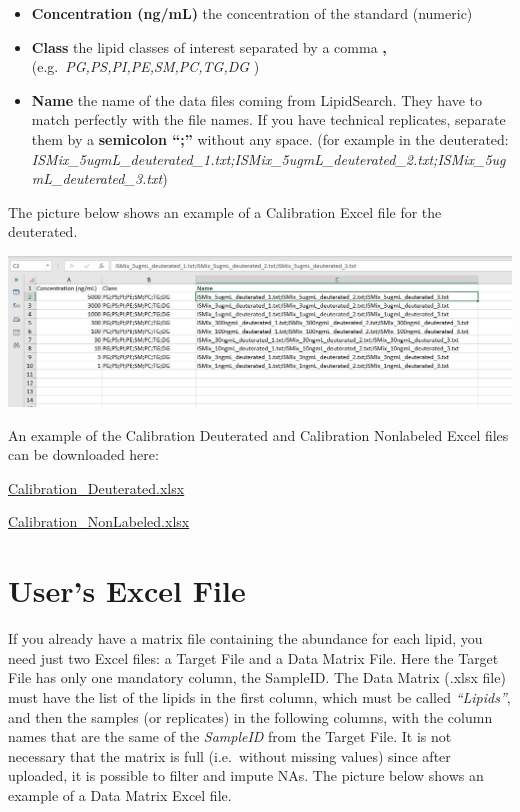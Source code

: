 \documentclass[
]{book}
\providecommand{\tightlist}{%
  \setlength{\itemsep}{0pt}\setlength{\parskip}{0pt}}
\begin{document}
\begin{itemize}
\tightlist
\item
  \textbf{Concentration (ng/mL)} the concentration of the standard (numeric)
\item
  \textbf{Class} the lipid classes of interest separated by a comma \textbf{,} (e.g.~\emph{PG,PS,PI,PE,SM,PC,TG,DG} )
\item
  \textbf{Name} the name of the data files coming from LipidSearch. They have to match perfectly with the file names. If you have technical replicates, separate them by a \textbf{semicolon ``;''} without any space. (for example in the deuterated: \emph{ISMix\_5ugmL\_deuterated\_1.txt;ISMix\_5ugmL\_deuterated\_2.txt;ISMix\_5ugmL\_deuterated\_3.txt})
\end{itemize}

The picture below shows an example of a Calibration Excel file for the deuterated.

\includegraphics[width=1\linewidth]{images/calibration_deut_example}

An example of the Calibration Deuterated and Calibration Nonlabeled Excel files can be downloaded here:

\href{https://github.com/ShinyFabio/ADViSELipidomics_book/raw/main/data_example/Calibration_Deuterated.xlsx}{Calibration\_Deuterated.xlsx}

\href{https://github.com/ShinyFabio/ADViSELipidomics_book/raw/main/data_example/Calibration_NonLabeled.xlsx}{Calibration\_NonLabeled.xlsx}

\hypertarget{sec25}{%
\section{User's Excel File}\label{sec25}}

If you already have a matrix file containing the abundance for each lipid, you need just two Excel files: a Target File and a Data Matrix File. Here the Target File has only one mandatory column, the SampleID. The Data Matrix (.xlsx file) must have the list of the lipids in the first column, which must be called \emph{``Lipids''}, and then the samples (or replicates) in the following columns, with the column names that are the same of the \emph{SampleID} from the Target File. It is not necessary that the matrix is full (i.e.~without missing values) since after uploaded, it is possible to filter and impute NAs. The picture below shows an example of a Data Matrix Excel file.
\end{document}
